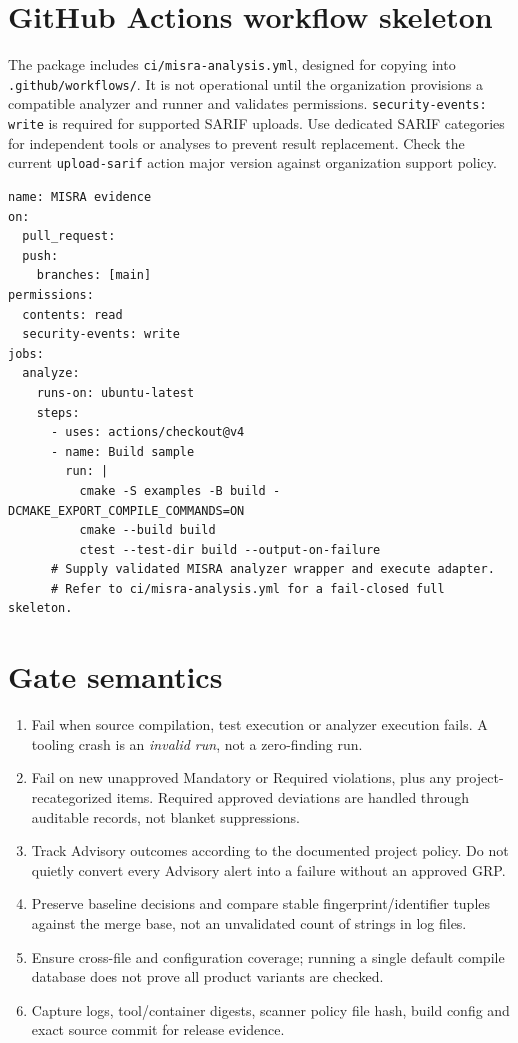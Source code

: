 \documentclass[10pt,letterpaper]{article}
\begin{document}
\section{GitHub Actions workflow skeleton}
The package includes \texttt{ci/misra-analysis.yml}, designed for copying into \texttt{.github/workflows/}. It is not operational until the organization provisions a compatible analyzer and runner and validates permissions. \texttt{security-events: write} is required for supported SARIF uploads. Use dedicated SARIF categories for independent tools or analyses to prevent result replacement. Check the current \texttt{upload-sarif} action major version against organization support policy.
\begin{lstlisting}[style=plaincode]
name: MISRA evidence
on:
  pull_request:
  push:
    branches: [main]
permissions:
  contents: read
  security-events: write
jobs:
  analyze:
    runs-on: ubuntu-latest
    steps:
      - uses: actions/checkout@v4
      - name: Build sample
        run: |
          cmake -S examples -B build -DCMAKE_EXPORT_COMPILE_COMMANDS=ON
          cmake --build build
          ctest --test-dir build --output-on-failure
      # Supply validated MISRA analyzer wrapper and execute adapter.
      # Refer to ci/misra-analysis.yml for a fail-closed full skeleton.
\end{lstlisting}
\section{Gate semantics}
\begin{enumerate}
\item Fail when source compilation, test execution or analyzer execution fails. A tooling crash is an \emph{invalid run}, not a zero-finding run.
\item Fail on new unapproved Mandatory or Required violations, plus any project-recategorized items. Required approved deviations are handled through auditable records, not blanket suppressions.
\item Track Advisory outcomes according to the documented project policy. Do not quietly convert every Advisory alert into a failure without an approved GRP.
\item Preserve baseline decisions and compare stable fingerprint/identifier tuples against the merge base, not an unvalidated count of strings in log files.
\item Ensure cross-file and configuration coverage; running a single default compile database does not prove all product variants are checked.
\item Capture logs, tool/container digests, scanner policy file hash, build config and exact source commit for release evidence.
\end{enumerate}
\end{document}
